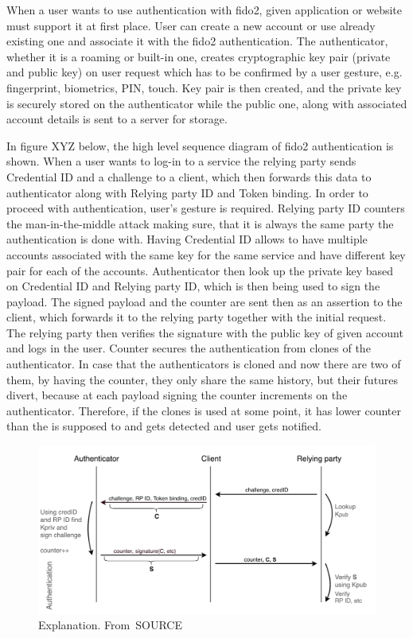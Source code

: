 When a user wants to use authentication with \acrshort{fido}2, given application or website must support it at first place. User can create a new account or use already existing one and associate it with the \acrshort{fido}2 authentication. The authenticator, whether it is a roaming or built-in one, creates cryptographic key pair (private and public key) on user request which has to be confirmed by a user gesture, e.g. fingerprint, biometrics, PIN, touch. Key pair is then created, and the private key is securely stored on the authenticator while the public one, along with associated account details is sent to a server for storage.

In figure XYZ below, the high level sequence diagram of \acrshort{fido}2 authentication is shown. When a user wants to log-in to a service the relying party sends Credential ID and a challenge to a client, which then forwards this data to authenticator along with Relying party ID and Token binding. In order to proceed with authentication, user's gesture is required. Relying party ID counters the man-in-the-middle attack making sure, that it is always the same party the authentication is done with. Having Credential ID allows to have multiple accounts associated with the same key for the same service and have different key pair for each of the accounts. Authenticator then look up the private key based on Credential ID and Relying party ID, which is then being used to sign the payload. The signed payload and the counter are sent then as an assertion to the client, which forwards it to the relying party together with the initial request. The relying party then verifies the signature with the public key of given account and logs in the user. Counter secures the authentication from clones of the authenticator. In case that the authenticators is cloned and now there are two of them, by having the counter, they only share the same history, but their futures divert, because at each payload signing the counter increments on the authenticator. Therefore, if the clones is used at some point, it has lower counter than the is supposed to and gets detected and user gets notified.

\begin{figure}[ht]
    \centering
    \includegraphics[width=.95\textwidth]{00images/FIDO2_Authentication.png}
    \caption{Explanation. From~\cite{}SOURCE}
    \label{fig:fido2_authentication}
\end{figure}